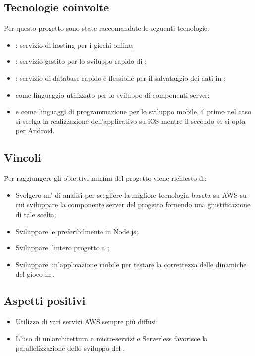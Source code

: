 \subsection{Tecnologie coinvolte}
Per questo progetto sono state raccomandate le seguenti tecnologie:
\begin{itemize}
	\item {}: servizio di hosting per i giochi online;
	\item {}: servizio gestito per lo sviluppo rapido di ;
	\item {}: servizio di database  rapido e flessibile per il salvataggio dei dati in ;
	\item {} come linguaggio utilizzato per lo sviluppo di componenti server;
	\item {} e  come linguaggi di programmazione per lo sviluppo mobile, il primo nel caso si scelga la realizzazione dell'applicativo su iOS mentre il secondo se si opta per Android.
\end{itemize}

\subsection{Vincoli}
Per raggiungere gli obiettivi minimi del progetto viene richiesto di:
\begin{itemize}
	\item Svolgere un' di analisi per scegliere la migliore tecnologia basata su AWS su cui sviluppare la componente server del progetto fornendo una giustificazione di tale scelta;
	\item Sviluppare le  preferibilmente in Node.js;
	\item Sviluppare l'intero progetto a ;
	\item Sviluppare un'applicazione mobile per testare la correttezza delle dinamiche del gioco in .
\end{itemize}

 \subsection{Aspetti positivi}
\begin{itemize}
	\item Utilizzo di vari servizi AWS sempre più diffusi.
	\item L'uso di un'architettura a micro-servizi e Serverless favorisce la parallelizzazione dello sviluppo del .
\end{itemize}

